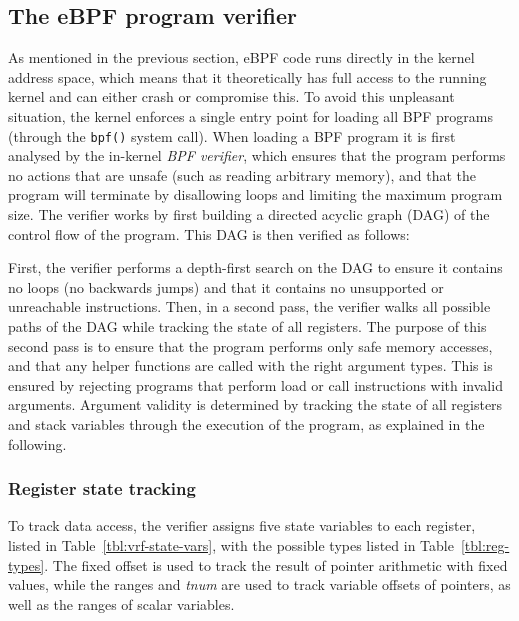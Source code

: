\documentclass[10pt]{sig-alternate-05-2015}
\begin{document}
\subsection{The eBPF program verifier}
\label{sec:bpf-verifier}
As mentioned in the previous section, eBPF code runs directly in the kernel
address space, which means that it theoretically has full access to the running
kernel and can either crash or compromise this. To avoid this unpleasant
situation, the kernel enforces a single entry point for loading all BPF programs
(through the \texttt{bpf()} system call). When loading a BPF program it is first
analysed by the in-kernel \emph{BPF verifier}, which ensures that the program
performs no actions that are unsafe (such as reading arbitrary memory), and that
the program will terminate by disallowing loops and limiting the maximum program
size. The verifier works by first building a directed acyclic graph (DAG) of the
control flow of the program. This DAG is then verified as follows:

First, the verifier performs a depth-first search on the DAG to ensure it
contains no loops (no backwards jumps) and that it contains no unsupported or
unreachable instructions. Then, in a second pass, the verifier walks all
possible paths of the DAG while tracking the state of all registers. The purpose
of this second pass is to ensure that the program performs only safe memory
accesses, and that any helper functions are called with the right argument
types. This is ensured by rejecting programs that perform load or call
instructions with invalid arguments. Argument validity is determined by tracking
the state of all registers and stack variables through the execution of the
program, as explained in the following.

\subsubsection{Register state tracking}
\label{sec:reg-state}
To track data access, the verifier assigns five state variables to each
register, listed in Table \ref{tbl:vrf-state-vars}, with the possible types listed in
Table \ref{tbl:reg-types}. The fixed offset is used to track the result of pointer
arithmetic with fixed values, while the ranges and \emph{tnum} are used to track
variable offsets of pointers, as well as the ranges of scalar variables.
\end{document}
